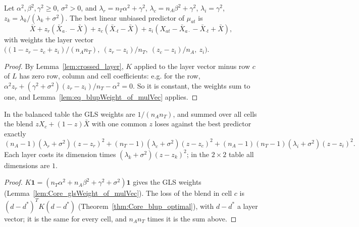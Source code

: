 \begin{theorem}\label{thm:crossed_balanced}
  \leanok
  Let $\alpha^2, \beta^2, \gamma^2 \ge 0$, $\sigma^2 > 0$, and
  $\lambda_r = n_T\alpha^2 + \gamma^2$, $\lambda_c = n_A\beta^2 + \gamma^2$, $\lambda_i = \gamma^2$,
  $z_k = \lambda_k/(\lambda_k + \sigma^2)$. The best linear unbiased predictor of $\mu_{at}$ is
  \[
    \bar X + z_r(\bar X_{a\cdot} - \bar X) + z_c(\bar X_{\cdot t} - \bar X)
      + z_i(X_{at} - \bar X_{a\cdot} - \bar X_{\cdot t} + \bar X),
  \]
  with weights the layer vector
  $\bigl((1 - z_r - z_c + z_i)/(n_An_T),\ (z_r - z_i)/n_T,\ (z_c - z_i)/n_A,\ z_i\bigr)$.
\end{theorem}
\begin{proof}
  \leanok
  By Lemma~\ref{lem:crossed_layer}, $K$ applied to the layer vector minus row $c$ of $L$ has
  zero row, column and cell coefficients: e.g. for the row,
  $\alpha^2 z_r + (\gamma^2 + \sigma^2)(z_r - z_i)/n_T - \alpha^2 = 0$. So it is constant, the
  weights sum to one, and Lemma~\ref{lem:eq_blupWeight_of_mulVec} applies.
\end{proof}

\begin{theorem}\label{thm:crossed_blend_excess}
  \leanok
  In the balanced table the GLS weights are $1/(n_An_T)$, and summed over all cells the blend
  $zX_c + (1 - z)\bar X$ with one common $z$ loses against the best predictor exactly
  \[
    (n_A - 1)(\lambda_r + \sigma^2)(z - z_r)^2 + (n_T - 1)(\lambda_c + \sigma^2)(z - z_c)^2
      + (n_A - 1)(n_T - 1)(\lambda_i + \sigma^2)(z - z_i)^2 .
  \]
  Each layer costs its dimension times $(\lambda_k + \sigma^2)(z - z_k)^2$; in the $2 \times 2$
  table all dimensions are $1$.
\end{theorem}
\begin{proof}
  \leanok
  $K\mathbf 1 = (n_T\alpha^2 + n_A\beta^2 + \gamma^2 + \sigma^2)\mathbf 1$ gives the GLS
  weights (Lemma~\ref{lem:Core_glsWeight_of_mulVec}). The loss of the blend in cell $c$ is
  $(d - d^*)^TK(d - d^*)$ (Theorem~\ref{thm:Core_blup_optimal}), with $d - d^*$ a layer vector;
  it is the same for every cell, and $n_An_T$ times it is the sum above.
\end{proof}


